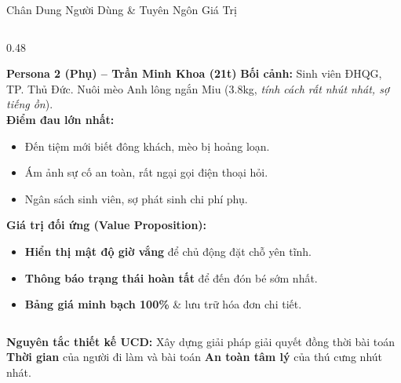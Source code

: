 \begin{frame}{Chân Dung Người Dùng \& Tuyên Ngôn Giá Trị}
\begin{columns}[T]
    \begin{column}{0.48\textwidth}
      \begin{exampleblock}{\footnotesize \textbf{Persona 2 (Phụ) -- Trần Minh Khoa (21t)}}
        \scriptsize
        \textbf{Bối cảnh:} Sinh viên ĐHQG, TP. Thủ Đức. Nuôi mèo Anh lông ngắn Miu (3.8kg, \textit{tính cách rất nhút nhát, sợ tiếng ồn}).\\[1mm]
        \textbf{Điểm đau lớn nhất:}
        \begin{itemize}
          \tiny
          \item Đến tiệm mới biết đông khách, mèo bị hoảng loạn.
          \item Ám ảnh sự cố an toàn, rất ngại gọi điện thoại hỏi.
          \item Ngân sách sinh viên, sợ phát sinh chi phí phụ.
        \end{itemize}
        \textbf{Giá trị đối ứng (Value Proposition):}
        \begin{itemize}
          \tiny
          \item \textbf{Hiển thị mật độ giờ vắng} để chủ động đặt chỗ yên tĩnh.
          \item \textbf{Thông báo trạng thái hoàn tất} để đến đón bé sớm nhất.
          \item \textbf{Bảng giá minh bạch 100\%} \& lưu trữ hóa đơn chi tiết.
        \end{itemize}
      \end{exampleblock}
    \end{column}
  \end{columns}

  \vspace{1.5mm}
  \begin{center}
    \scriptsize \color{PetcarePrimary}
    \textbf{Nguyên tắc thiết kế UCD:} Xây dựng giải pháp giải quyết đồng thời bài toán \textbf{Thời gian} của người đi làm và bài toán \textbf{An toàn tâm lý} của thú cưng nhút nhát.
  \end{center}
\end{frame}
